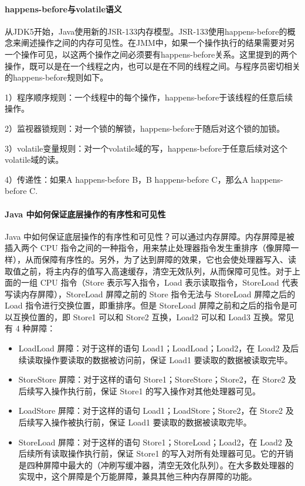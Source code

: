 \documentclass[../../../interview-questions.tex]{subfiles}
\begin{document}
\paragraph{happens-before与volatile语义}

从JDK5开始，Java使用新的JSR-133内存模型。JSR-133使用happens-before的概念来阐述操作之间的内存可见性。在JMM中，如果一个操作执行的结果需要对另一个操作可见，以这两个操作之间必须要有happens-before关系。这里提到的两个操作，既可以是在一个线程之内，也可以是在不同的线程之间。与程序员密切相关的happens-before规则如下。

1）程序顺序规则：一个线程中的每个操作，happens-before于该线程的任意后续操作。

2）监视器锁规则：对一个锁的解锁，happens-before于随后对这个锁的加锁。

3）volatile变量规则：对一个volatile域的写，happens-before于任意后续对这个volatile域的读。

4）传递性：如果A happens-before B，B happens-before C，那么A happens-before C.

\paragraph{Java 中如何保证底层操作的有序性和可见性}

Java 中如何保证底层操作的有序性和可见性？可以通过内存屏障。内存屏障是被插入两个 CPU 指令之间的一种指令，用来禁止处理器指令发生重排序（像屏障一样），从而保障有序性的。另外，为了达到屏障的效果，它也会使处理器写入、读取值之前，将主内存的值写入高速缓存，清空无效队列，从而保障可见性。对于上面的一组 CPU 指令（Store 表示写入指令，Load 表示读取指令，StoreLoad 代表写读内存屏障），StoreLoad 屏障之前的 Store 指令无法与 StoreLoad 屏障之后的 Load 指令进行交换位置，即重排序。但是 StoreLoad 屏障之前和之后的指令是可以互换位置的，即 Store1 可以和 Store2 互换，Load2 可以和 Load3 互换。常见有 4 种屏障：

\begin{itemize}
    \item {LoadLoad 屏障：对于这样的语句 Load1；LoadLoad；Load2，在 Load2 及后续读取操作要读取的数据被访问前，保证 Load1 要读取的数据被读取完毕。}
    \item {StoreStore 屏障：对于这样的语句 Store1；StoreStore；Store2，在 Store2 及后续写入操作执行前，保证 Store1 的写入操作对其他处理器可见。}
    \item {LoadStore 屏障：对于这样的语句 Load1；LoadStore；Store2，在 Store2 及后续写入操作被执行前，保证 Load1 要读取的数据被读取完毕。}
    \item {StoreLoad 屏障：对于这样的语句 Store1；StoreLoad；Load2，在 Load2 及后续所有读取操作执行前，保证 Store1 的写入对所有处理器可见。它的开销是四种屏障中最大的（冲刷写缓冲器，清空无效化队列）。在大多数处理器的实现中，这个屏障是个万能屏障，兼具其他三种内存屏障的功能。}
\end{itemize}
\end{document}
